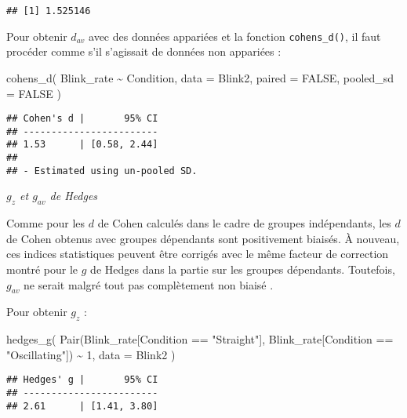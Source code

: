 \documentclass[
]{book}
\newenvironment{Shaded}{\begin{snugshade}}{\end{snugshade}}
\newcommand{\AttributeTok}[1]{\textcolor[rgb]{0.77,0.63,0.00}{#1}}
\newcommand{\ConstantTok}[1]{\textcolor[rgb]{0.00,0.00,0.00}{#1}}
\newcommand{\DecValTok}[1]{\textcolor[rgb]{0.00,0.00,0.81}{#1}}
\newcommand{\FunctionTok}[1]{\textcolor[rgb]{0.00,0.00,0.00}{#1}}
\newcommand{\NormalTok}[1]{#1}
\newcommand{\SpecialCharTok}[1]{\textcolor[rgb]{0.00,0.00,0.00}{#1}}
\newcommand{\StringTok}[1]{\textcolor[rgb]{0.31,0.60,0.02}{#1}}
\begin{document}
\begin{verbatim}
## [1] 1.525146
\end{verbatim}

Pour obtenir \(d_{av}\) avec des données appariées et la fonction \texttt{cohens\_d()}, il faut procéder comme s'il s'agissait de données non appariées :

\begin{Shaded}
\begin{Highlighting}[]
\FunctionTok{cohens\_d}\NormalTok{(}
\NormalTok{  Blink\_rate }\SpecialCharTok{\textasciitilde{}}\NormalTok{ Condition,}
  \AttributeTok{data =}\NormalTok{ Blink2,}
  \AttributeTok{paired =} \ConstantTok{FALSE}\NormalTok{, }
  \AttributeTok{pooled\_sd =} \ConstantTok{FALSE}
\NormalTok{  )}
\end{Highlighting}
\end{Shaded}

\begin{verbatim}
## Cohen's d |       95% CI
## ------------------------
## 1.53      | [0.58, 2.44]
## 
## - Estimated using un-pooled SD.
\end{verbatim}

\emph{\(g_{z}\) et \(g_{av}\) de Hedges}

Comme pour les \(d\) de Cohen calculés dans le cadre de groupes indépendants, les \(d\) de Cohen obtenus avec groupes dépendants sont positivement biaisés. À nouveau, ces indices statistiques peuvent être corrigés avec le même facteur de correction montré pour le \(g\) de Hedges dans la partie sur les groupes dépendants. Toutefois, \(g_{av}\) ne serait malgré tout pas complètement non biaisé \autocite{lakensCalculatingReportingEffect2013}.

Pour obtenir \(g_z\) :

\begin{Shaded}
\begin{Highlighting}[]
\FunctionTok{hedges\_g}\NormalTok{(}
  \FunctionTok{Pair}\NormalTok{(Blink\_rate[Condition }\SpecialCharTok{==} \StringTok{"Straight"}\NormalTok{], Blink\_rate[Condition }\SpecialCharTok{==} \StringTok{"Oscillating"}\NormalTok{]) }\SpecialCharTok{\textasciitilde{}} \DecValTok{1}\NormalTok{, }
  \AttributeTok{data =}\NormalTok{ Blink2}
\NormalTok{  )}
\end{Highlighting}
\end{Shaded}

\begin{verbatim}
## Hedges' g |       95% CI
## ------------------------
## 2.61      | [1.41, 3.80]
\end{verbatim}
\end{document}
